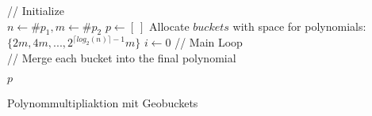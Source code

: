 \begin{algorithm}
\SetAlgoLined
\label{algo:mult}
// Initialize \\
$n \gets \#p_1, m\gets \#p_2$ \;
$p \gets [\ ]$ \;
Allocate $buckets$ with space for polynomials: $\{2m, 4m, ..., 2^{\lceil log_2(n)\rceil -1 }m\}$\;
$i\gets 0 $\;
// Main Loop \\
// Merge each bucket into the final polynomial\\


\Return $p$

 \caption{Polynommultipliaktion mit Geobuckets}
\end{algorithm}
